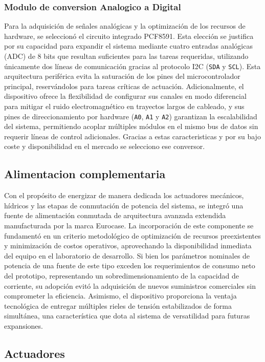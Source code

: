 \subsubsection{Modulo de conversion Analogico a Digital}
Para la adquisición de señales analógicas y la optimización de los recursos de hardware, se seleccionó el circuito integrado PCF8591. Esta elección se justifica por su capacidad para expandir el sistema mediante cuatro entradas analógicas (ADC) de 8 bits que resultan suficientes para las tareas requeridas, utilizando únicamente dos líneas de comunicación gracias al protocolo I2C (\texttt{SDA} y \texttt{SCL}). Esta arquitectura periférica evita la saturación de los pines del microcontrolador principal, reservándolos para tareas críticas de actuación. Adicionalmente, el dispositivo ofrece la flexibilidad de configurar sus canales en modo diferencial para mitigar el ruido electromagnético en trayectos largos de cableado, y sus pines de direccionamiento por hardware (\texttt{A0}, \texttt{A1} y \texttt{A2}) garantizan la escalabilidad del sistema, permitiendo acoplar múltiples módulos en el mismo bus de datos sin requerir líneas de control adicionales. 
Gracias a estas caracteristicas y por su bajo coste y disponibilidad en el mercado se selecciono ese conversor.

\subsection{Alimentacion complementaria}
Con el propósito de energizar de manera dedicada los actuadores mecánicos, hídricos y las etapas de conmutación de potencia del sistema, se integró una fuente de alimentación conmutada de arquitectura avanzada extendida manufacturada por la marca Eurocase. La incorporación de este componente se fundamentó en un criterio metodológico de optimización de recursos preexistentes y minimización de costos operativos, aprovechando la disponibilidad inmediata del equipo en el laboratorio de desarrollo. Si bien los parámetros nominales de potencia de una fuente de este tipo exceden los requerimientos de consumo neto del prototipo, representando un sobredimensionamiento de la capacidad de corriente, su adopción evitó la adquisición de nuevos suministros comerciales sin comprometer la eficiencia. Asimismo, el dispositivo proporciona la ventaja tecnológica de entregar múltiples rieles de tensión estabilizados de forma simultánea, una característica que dota al sistema de versatilidad para futuras expansiones.

\subsection{Actuadores}
